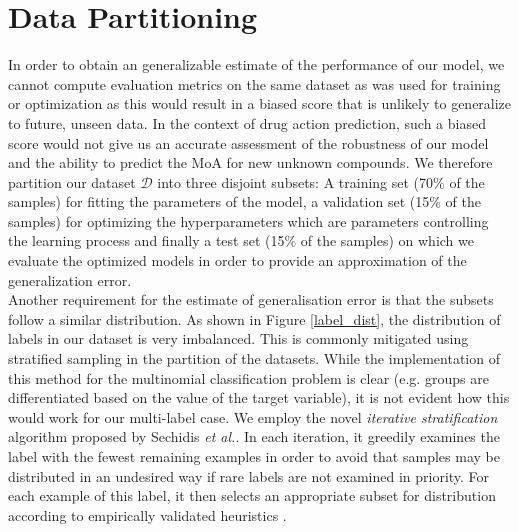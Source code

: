 \documentclass[bsc,frontabs,twoside,singlespacing,parskip,deptreport]{infthesis}     %
\let\Oldsection\section
\renewcommand{\section}{\FloatBarrier\Oldsection}
\begin{document}
\section{Data Partitioning}
In order to obtain an generalizable estimate of the performance of our model, we cannot compute evaluation metrics on the same dataset as was used for training or optimization as this would result in a biased score that is unlikely to generalize to future, unseen data. In the context of drug action prediction, such a biased score would not give us an accurate assessment of the robustness of our model and the ability to predict the MoA for new unknown compounds. 
We therefore partition our dataset \(\mathscr{D}\) into three disjoint subsets: A training set (70\% of the samples) for fitting the parameters of the model, a validation set (15\% of the samples) for optimizing the hyperparameters which are parameters controlling the learning process and finally a test set (15\% of the samples) on which we evaluate the optimized models in order to provide an approximation of the generalization error.\\
Another requirement for the estimate of generalisation error is that the subsets follow a similar distribution. As shown in Figure \ref{label_dist}, the distribution of labels in our dataset is very imbalanced. This is commonly mitigated using stratified sampling in the partition of the datasets. While the implementation of this method for the multinomial classification problem is clear (e.g. groups are differentiated based on the value of the target variable), it is not evident how this would work for our multi-label case. We employ the novel \textit{iterative stratification} algorithm proposed by Sechidis \textit{et al.}. In each iteration, it greedily examines the label with the fewest remaining examples in order to avoid that samples may be distributed in an undesired way if rare labels are not examined in priority. For each example of this label, it then selects an appropriate subset for distribution according to empirically validated heuristics \cite{sechidis_stratication_nodate}.
\end{document}
